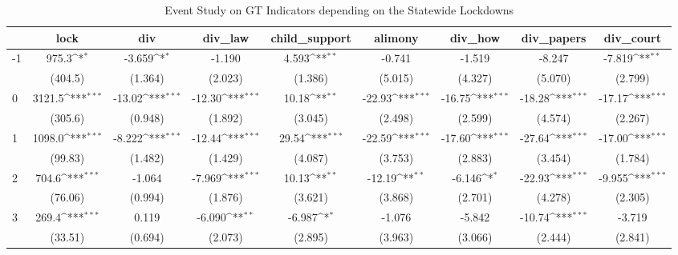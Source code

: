 \documentclass{article}
\begin{document}
{
\def\sym#1{\ifmmode^{#1}\else\(^{#1}\)\fi}
\begin{longtable}{l*{8}{c}}
\caption{Event Study on GT Indicators depending on the Statewide Lockdowns}\\
\hline\hline\endfirsthead\hline\endhead\hline\endfoot\endlastfoot
                &\multicolumn{1}{c}{lock}&\multicolumn{1}{c}{div}&\multicolumn{1}{c}{div\_law}&\multicolumn{1}{c}{child\_support}&\multicolumn{1}{c}{alimony}&\multicolumn{1}{c}{div\_how}&\multicolumn{1}{c}{div\_papers}&\multicolumn{1}{c}{div\_court}\\
\hline
-1              &    975.3\sym{*}  &   -3.659\sym{*}  &   -1.190         &    4.593\sym{**} &   -0.741         &   -1.519         &   -8.247         &   -7.819\sym{**} \\
                &  (404.5)         &  (1.364)         &  (2.023)         &  (1.386)         &  (5.015)         &  (4.327)         &  (5.070)         &  (2.799)         \\
0               &   3121.5\sym{***}&   -13.02\sym{***}&   -12.30\sym{***}&    10.18\sym{**} &   -22.93\sym{***}&   -16.75\sym{***}&   -18.28\sym{***}&   -17.17\sym{***}\\
                &  (305.6)         &  (0.948)         &  (1.892)         &  (3.045)         &  (2.498)         &  (2.599)         &  (4.574)         &  (2.267)         \\
1               &   1098.0\sym{***}&   -8.222\sym{***}&   -12.44\sym{***}&    29.54\sym{***}&   -22.59\sym{***}&   -17.60\sym{***}&   -27.64\sym{***}&   -17.00\sym{***}\\
                &  (99.83)         &  (1.482)         &  (1.429)         &  (4.087)         &  (3.753)         &  (2.883)         &  (3.454)         &  (1.784)         \\
2               &    704.6\sym{***}&   -1.064         &   -7.969\sym{***}&    10.13\sym{**} &   -12.19\sym{**} &   -6.146\sym{*}  &   -22.93\sym{***}&   -9.955\sym{***}\\
                &  (76.06)         &  (0.994)         &  (1.876)         &  (3.621)         &  (3.868)         &  (2.701)         &  (4.278)         &  (2.305)         \\
3               &    269.4\sym{***}&    0.119         &   -6.090\sym{**} &   -6.987\sym{*}  &   -1.076         &   -5.842         &   -10.74\sym{***}&   -3.719         \\
                &  (33.51)         &  (0.694)         &  (2.073)         &  (2.895)         &  (3.963)         &  (3.066)         &  (2.444)         &  (2.841)         \\

\end{longtable}}
\end{document}
